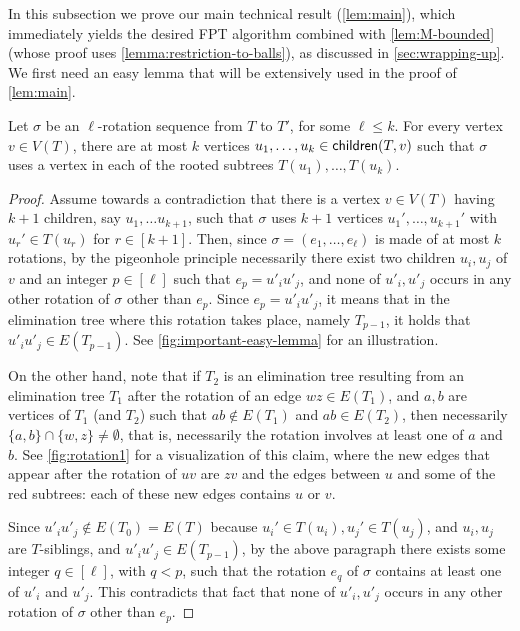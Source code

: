 \documentclass[a4paper,UKenglish,cleveref, autoref, thm-restate]{lipics-v2021}
\newcommand{\child}{{\sf children}\xspace}
\newcommand{\FPT}{{\sf FPT}\xspace}
\begin{document}
In this subsection we prove our main technical result (\autoref{lem:main}), which immediately yields the desired \FPT algorithm combined  with  \autoref{lem:M-bounded} (whose proof uses  \autoref{lemma:restriction-to-balls}), as discussed in \autoref{sec:wrapping-up}. We first need an easy lemma that will be extensively used in the proof of \autoref{lem:main}.

\begin{lemma}\label{lem:few-siblings-involved}
Let $\sigma$ be an $\ell$-rotation sequence from $T$ to $T'$, for some $\ell \leq k$. For every vertex $v \in V(T)$, there are at most  $k$ vertices  $u_1, \ldots, u_k \in \child(T,v)$ such that $\sigma$ uses a vertex in each of the rooted subtrees $T(u_1), \ldots, T(u_k)$.
\end{lemma}
\begin{proof}
Assume towards a contradiction that there is a vertex $v \in V(T)$ having   $k+1$ children, say $u_1, \ldots u_{k+1}$, such that $\sigma$ uses $k+1$ vertices $u_1', \ldots, u_{k+1}'$ with $u_r' \in T(u_r)$ for $r \in [k+1]$. Then, since $\sigma=(e_1,\ldots,e_{\ell})$ is made of at most $k$ rotations, by the pigeonhole principle necessarily there exist two children $u_i,u_j$ of $v$ and an integer $p \in [\ell]$ such that $e_p = u'_iu'_j$, and none of $u'_i,u'_j$ occurs in any other rotation of $\sigma$ other than $e_p$. Since $e_p = u'_iu'_j$, it means that in the elimination tree where this rotation takes place, namely $T_{p-1}$, it holds that $u'_iu'_j \in E(T_{p-1})$. See \autoref{fig:important-easy-lemma} for an illustration.

On the other hand, note that if $T_2$ is an elimination tree resulting from an elimination tree $T_1$ after the rotation of an edge $wz \in E(T_1)$, and $a,b$ are vertices of $T_1$ (and $T_2$) such that $ab \notin E(T_1)$ and $ab \in E(T_2)$, then necessarily $\{a,b\} \cap \{w,z\} \neq \emptyset$, that is, necessarily the rotation involves at least one of $a$ and $b$. See \autoref{fig:rotation1} for a visualization of this claim, where the new edges that appear after the rotation of $uv$ are $zv$ and the edges between $u$ and some of the red subtrees: each of these new edges contains $u$ or $v$.

Since $u'_iu'_j \notin E(T_0) = E(T)$ because $u_i' \in T(u_i), u_j' \in T(u_j)$, and $u_i,u_j$ are $T$-siblings, and $u'_iu'_j \in E(T_{p-1})$, by the above paragraph there exists some integer $q \in [\ell]$, with $q < p$, such that the rotation $e_q$ of $\sigma$ contains at least one of $u'_i$ and $u'_j$. This contradicts that fact that none of $u'_i,u'_j$ occurs in any other rotation of $\sigma$ other than $e_p$.
\end{proof}
\end{document}
